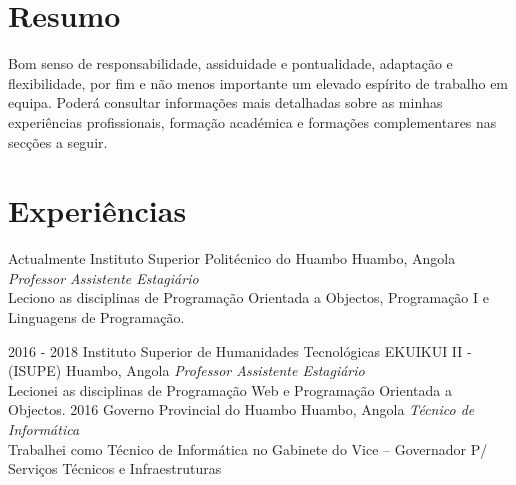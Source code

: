 \divider
\section{Resumo}
  \vspace{-0.2cm}
  
  Bom senso de responsabilidade, assiduidade e pontualidade, adaptação e flexibilidade, por fim e não menos importante um elevado espírito de trabalho em equipa. Poderá consultar informações mais detalhadas sobre as minhas experiências profissionais, formação académica e formações complementares nas secções a seguir.\\
  \divider

\section{Experiências}

\begin{entrada}

\lista
  {Actualmente}
  {Instituto Superior Politécnico do Huambo}
  {Huambo, Angola}
  {\textsf{\emph{Professor Assistente Estagiário}}\\
  \small{Leciono as disciplinas de Programação Orientada a Objectos}, Programação I e Linguagens de Programação.}

\lista
  {2016 - 2018}
  {Instituto Superior de Humanidades Tecnológicas EKUIKUI II - (ISUPE)}
  {Huambo, Angola}
  {\textsf{\emph{Professor Assistente Estagiário}}\\
  \small{Lecionei as disciplinas de Programação Web e Programação Orientada a Objectos.}}
\lista
  {2016}
  {Governo Provincial do Huambo}
  {Huambo, Angola}
  {\textsf{\emph{Técnico de Informática}}\\
  \small{Trabalhei como Técnico de Informática no Gabinete do Vice – Governador P/ Serviços Técnicos e Infraestruturas}}



\end{entrada}

